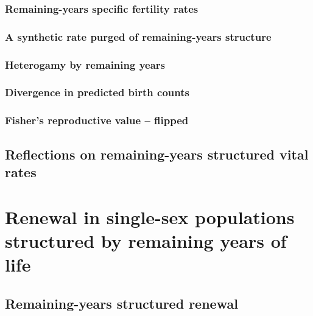     \subsection{Remaining-years specific fertility rates}
      
      
    \subsection{A synthetic rate purged of remaining-years structure}
      
    
    \subsection{Heterogamy by remaining years}
      
      
    \subsection{Divergence in predicted birth counts}
      
    \subsection{Fisher's reproductive value -- flipped}
      
  \section{Reflections on remaining-years structured vital rates}
      

  \chapter{Renewal in single-sex populations structured by remaining years of
life}
    
    \section{Remaining-years structured renewal}
      
